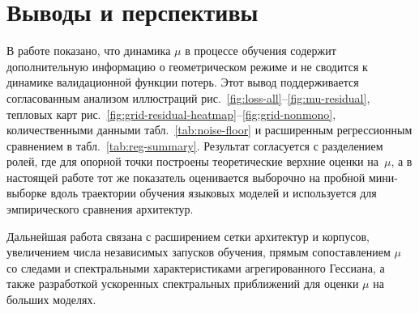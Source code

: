 \documentclass[11pt]{ubs}
\begin{document}
\section{Выводы и перспективы}

В работе показано, что динамика $\mu$ в процессе обучения содержит дополнительную информацию о геометрическом режиме и не сводится к динамике валидационной функции потерь.
Этот вывод поддерживается согласованным анализом иллюстраций рис.~\ref{fig:loss-all}--\ref{fig:mu-residual}, тепловых карт рис.~\ref{fig:grid-residual-heatmap}--\ref{fig:grid-nonmono}, количественными данными табл.~\ref{tab:noise-floor} и расширенным регрессионным сравнением в табл.~\ref{tab:reg-summary}.
Результат согласуется с разделением ролей, где для опорной точки построены теоретические верхние оценки на~$\mu$, а в настоящей работе тот же показатель оценивается выборочно на пробной мини-выборке вдоль траектории обучения языковых моделей и используется для эмпирического сравнения архитектур.

Дальнейшая работа связана с расширением сетки архитектур и корпусов, увеличением числа независимых запусков обучения, прямым сопоставлением $\mu$ со следами и спектральными характеристиками агрегированного Гессиана, а также разработкой ускоренных спектральных приближений для оценки $\mu$ на больших моделях.
\end{document}
